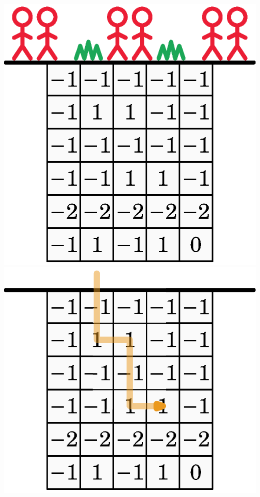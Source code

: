 \begin{center}
    \includegraphics[scale=0.6]{figures/coding_descendingdrills_03.eps}
    \includegraphics[scale=0.6]{figures/coding_descendingdrills_04.eps}
\end{center}

